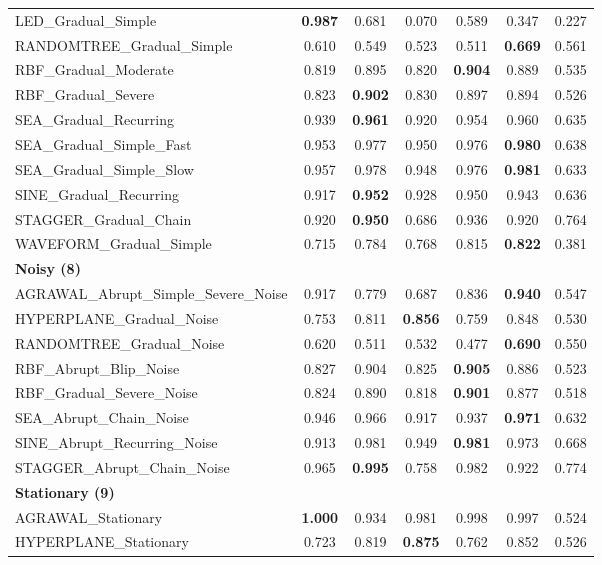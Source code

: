 \begin{table}[ht]
\begin{tabular}{l|cccccc}
LED\_Gradual\_Simple & \textbf{0.987} & 0.681 & 0.070 & 0.589 & 0.347 & 0.227 \\
RANDOMTREE\_Gradual\_Simple & 0.610 & 0.549 & 0.523 & 0.511 & \textbf{0.669} & 0.561 \\
RBF\_Gradual\_Moderate & 0.819 & 0.895 & 0.820 & \textbf{0.904} & 0.889 & 0.535 \\
RBF\_Gradual\_Severe & 0.823 & \textbf{0.902} & 0.830 & 0.897 & 0.894 & 0.526 \\
SEA\_Gradual\_Recurring & 0.939 & \textbf{0.961} & 0.920 & 0.954 & 0.960 & 0.635 \\
SEA\_Gradual\_Simple\_Fast & 0.953 & 0.977 & 0.950 & 0.976 & \textbf{0.980} & 0.638 \\
SEA\_Gradual\_Simple\_Slow & 0.957 & 0.978 & 0.948 & 0.976 & \textbf{0.981} & 0.633 \\
SINE\_Gradual\_Recurring & 0.917 & \textbf{0.952} & 0.928 & 0.950 & 0.943 & 0.636 \\
STAGGER\_Gradual\_Chain & 0.920 & \textbf{0.950} & 0.686 & 0.936 & 0.920 & 0.764 \\
WAVEFORM\_Gradual\_Simple & 0.715 & 0.784 & 0.768 & 0.815 & \textbf{0.822} & 0.381 \\
\multicolumn{7}{l}{\textbf{Noisy (8)}} \\
AGRAWAL\_Abrupt\_Simple\_Severe\_Noise & 0.917 & 0.779 & 0.687 & 0.836 & \textbf{0.940} & 0.547 \\
HYPERPLANE\_Gradual\_Noise & 0.753 & 0.811 & \textbf{0.856} & 0.759 & 0.848 & 0.530 \\
RANDOMTREE\_Gradual\_Noise & 0.620 & 0.511 & 0.532 & 0.477 & \textbf{0.690} & 0.550 \\
RBF\_Abrupt\_Blip\_Noise & 0.827 & 0.904 & 0.825 & \textbf{0.905} & 0.886 & 0.523 \\
RBF\_Gradual\_Severe\_Noise & 0.824 & 0.890 & 0.818 & \textbf{0.901} & 0.877 & 0.518 \\
SEA\_Abrupt\_Chain\_Noise & 0.946 & 0.966 & 0.917 & 0.937 & \textbf{0.971} & 0.632 \\
SINE\_Abrupt\_Recurring\_Noise & 0.913 & 0.981 & 0.949 & \textbf{0.981} & 0.973 & 0.668 \\
STAGGER\_Abrupt\_Chain\_Noise & 0.965 & \textbf{0.995} & 0.758 & 0.982 & 0.922 & 0.774 \\
\multicolumn{7}{l}{\textbf{Stationary (9)}} \\
AGRAWAL\_Stationary & \textbf{1.000} & 0.934 & 0.981 & 0.998 & 0.997 & 0.524 \\
HYPERPLANE\_Stationary & 0.723 & 0.819 & \textbf{0.875} & 0.762 & 0.852 & 0.526 \\

\end{tabular}
\end{table}

